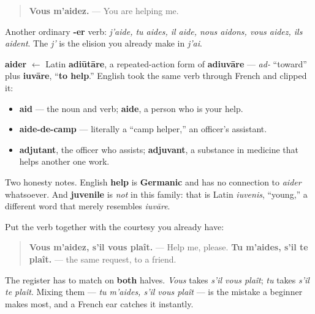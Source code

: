 \begin{quote}
\textbf{Vous m'aidez.} — You are helping me.
\end{quote}

Another ordinary \textbf{-er} verb: \emph{j'aide, tu aides, il aide, nous aidons, vous aidez, ils aident}. The \emph{j'} is the elision you already make in \emph{j'ai}.

\begin{cousinweb}
\textbf{aider} $\leftarrow$ Latin \textbf{adiūtāre}, a repeated-action form of \textbf{adiuvāre} — \emph{ad-} \textquotedblleft{}toward\textquotedblright{} plus \textbf{iuvāre}, \textquotedblleft{}\textbf{to help}.\textquotedblright{} English took the same verb through French and clipped it:

\begin{itemize}
\raggedright
  \item \textbf{aid} — the noun and verb; \textbf{aide}, a person who is your help.
  \item \textbf{aide-de-camp} — literally a \textquotedblleft{}camp helper,\textquotedblright{} an officer's assistant.
  \item \textbf{adjutant}, the officer who assists; \textbf{adjuvant}, a substance in medicine that helps another one work.
\end{itemize}

Two honesty notes. English \textbf{help} is \textbf{Germanic} and has no connection to \emph{aider} whatsoever. And \textbf{juvenile} is \emph{not} in this family: that is Latin \emph{iuvenis}, \textquotedblleft{}young,\textquotedblright{} a different word that merely resembles \emph{iuvāre}.
\end{cousinweb}

\begin{grammarlens}[title={Grammar Lens: asking for it politely}]
Put the verb together with the courtesy you already have:

\begin{quote}
\textbf{Vous m'aidez, s'il vous plaît.} — Help me, please. \textbf{Tu m'aides, s'il te plaît.} — the same request, to a friend.
\end{quote}

The register has to match on \textbf{both} halves. \emph{Vous} takes \emph{s'il vous plaît}; \emph{tu} takes \emph{s'il te plaît}. Mixing them — \emph{tu m'aides, s'il vous plaît} — is the mistake a beginner makes most, and a French ear catches it instantly.
\end{grammarlens}

